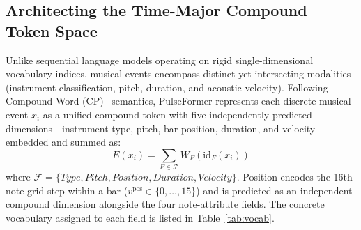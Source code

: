 \documentclass[pdflatex,sn-mathphys-num,twocolumn]{sn-jnl}
\theoremstyle{thmstyleone}
\theoremstyle{thmstyletwo}
\begin{document}
\subsection{Architecting the Time-Major Compound Token Space}
Unlike sequential language models operating on rigid single-dimensional vocabulary indices, musical events encompass distinct yet intersecting modalities (instrument classification, pitch, duration, and acoustic velocity). Following Compound Word (CP)~\cite{hsiao2021compound} semantics, PulseFormer represents each discrete musical event $x_i$ as a unified compound token with five independently predicted dimensions---instrument type, pitch, bar-position, duration, and velocity---embedded and summed as:
\begin{equation} \label{eq:embedding}
E(x_i) = \sum_{F \in \mathcal{F}} W_F(\text{id}_F(x_i))
\end{equation}
where $\mathcal{F} = \{Type, Pitch, Position, Duration, Velocity\}$. Position encodes the 16th-note grid step within a bar ($v^{\mathrm{pos}}\in\{0,\dots,15\}$) and is predicted as an independent compound dimension alongside the four note-attribute fields.
The concrete vocabulary assigned to each field is listed in Table~\ref{tab:vocab}.
\end{document}
